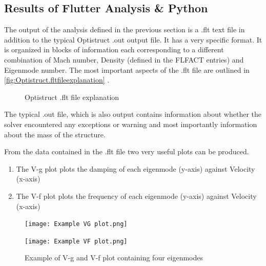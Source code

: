 \subsection{Results of Flutter Analysis \& Python }
\label{results-of-flutter-analysis-python}

The output of the analysis defined in the previous section is a .flt
text file in addition to the typical Optistruct .out output file. It has
a very specific format. It is organized in blocks of information each
corresponding to a different combination of Mach number, Density
(defined in the FLFACT entries) and Eigenmode number. The most important
aspects of the .flt file are outlined in \autoref{fig:Optistruct.fltfileexplanation} .

\begin{figure}[H]
    \centering
    
    \caption{Optistruct .flt file explanation}
    \label{fig:Optistruct.fltfileexplanation}
\end{figure}

The typical .out file, which is also output contains information about
whether the solver encountered any exceptions or warning and most
importantly information about the mass of the structure.

From the data contained in the .flt file two very useful plots can be
produced.

\begin{enumerate}
\def\labelenumi{\arabic{enumi}.}
\item
  The V-g plot plots the damping of each eigenmode (y-axis) against
  Velocity (x-axis)
\item
  The V-f plot plots the frequency of each eigenmode (y-axis) against
  Velocity (x-axis)
\end{enumerate}

\begin{figure}[H]
  \centering
  \begin{minipage}{0.495\textwidth}
      \centering
      \texttt{[image: Example VG plot.png]}
  \end{minipage}
  \hfill
  \begin{minipage}{0.495\textwidth}
      \centering
      \texttt{[image: Example VF plot.png]}

  \end{minipage}
  \caption{Example of V-g and V-f plot containing four eigenmodes \cite{altair_flutter_tips}}
\end{figure}


